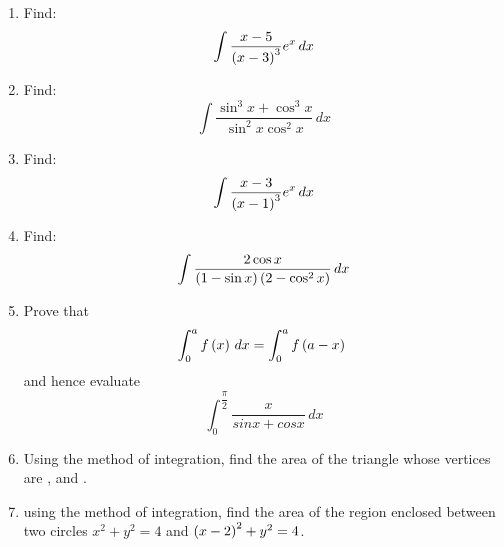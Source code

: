 \begin{enumerate}

\item Find:
\[\int \frac{x-5}{\left(x-3\right)^3} e^x \,dx\] 
\item Find:
\[\int \frac{\sin^3{x}+\cos^3{x}}{\sin^2{x}\cos^2{x}} \,dx\]
\item Find:
\[\int \frac{x-3}{\left(x-1\right)^3} e^x \, dx\]
\item Find:
  \[ \int \frac{2\cos x}{\left(1-\sin x\right)\left(2-\cos^{2} x\right)} \,dx \]
\item Prove that\\
\[ \int_{0}^{a} f\left(x\right) \,dx = \int_{0}^{a} f\left(a-x\right) \ \]
and hence evaluate\\
\[\int_{0}^{\dfrac{\pi}{2}} \frac{x}{sinx + cosx} \,dx\]
\item Using the method of integration, find the area of the triangle whose vertices are ,  and .                                   
\item using the method of integration, find the area of the region enclosed between two circles $ {x}^2 + {y}^2 = 4$ and  $ \left(x-2\right)^2 + {y}^2 = 4$.
\end{enumerate}
